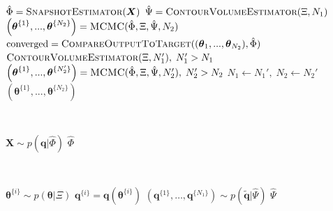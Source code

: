 \begin{algorithm}[H]
\footnotesize
\texttt{\\}
\begin{algorithmic}
	\State $\hat{\Phi} = \Call{SnapshotEstimator}{\boldsymbol{X}}$
	\State $\hat{\Psi} = \Call{ContourVolumeEstimator}{\Xi,N_1}$
	\State $\left(\boldsymbol{\theta}^{\{1\}},...,\boldsymbol{\theta}^{\{N_2\}}\right) = \Call{MCMC}{\hat{\Phi},\Xi, \hat{\Psi},N_2}$
	\State $\text{converged} = \Call{CompareOutputToTarget}{(\boldsymbol{\theta}_1,...,\boldsymbol{\theta}_{N_2}), \hat{\Phi}}$
	 
		 \State $\Call{ContourVolumeEstimator}{\Xi, N_1'},\; N_1' > N_1$
         \State $\left( \boldsymbol{\theta}^{\{1\}},...,\boldsymbol{\theta}^{\{N_2'\}} \right) 
                = \Call{MCMC}{\hat{\Phi},\Xi, \hat{\Psi},N_2'}, \; N_2' > N_2$
         \State $N_1 \leftarrow N_1', \; N_2 \leftarrow N_2'$
	\EndIf
	\State \Return $\left( \boldsymbol{\theta}^{\{1\}},...,\boldsymbol{\theta}^{\{N_2\}} \right)$
\EndProcedure
\end{algorithmic}

\texttt{\\}
\begin{algorithmic}
	\State $\boldsymbol{X} \sim p(\boldsymbol{q}|\hat{\Phi})$
	\State \Return $\hat{\Phi}$
\EndProcedure
\end{algorithmic}
	
\texttt{\\}
\begin{algorithmic}
		\State $\boldsymbol{\theta}^{\{i\}} \sim p(\boldsymbol{\theta}|\Xi)$           
		\State $\boldsymbol{q}^{\{i\}} = \boldsymbol{q}(\boldsymbol{\theta}^{\{i\}})$  
	\EndFor
	\State $\left( \boldsymbol{q}^{\{1\}}, \dots ,\boldsymbol{q}^{\{N_1\}} \right) \sim p(\tilde{\boldsymbol{q}}|\hat{\Psi})$
	\State \Return $\hat{\Psi}$
\EndProcedure
\end{algorithmic}


\end{algorithm}
